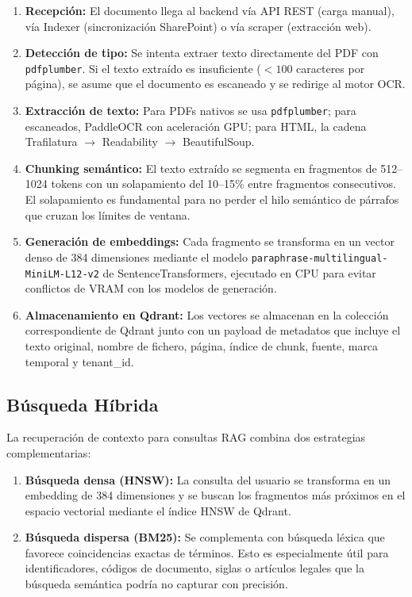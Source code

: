 \begin{enumerate}
    \item \textbf{Recepción:} El documento llega al backend vía API REST (carga manual), vía Indexer (sincronización SharePoint) o vía scraper (extracción web).

    \item \textbf{Detección de tipo:} Se intenta extraer texto directamente del PDF con \texttt{pdfplumber}. Si el texto extraído es insuficiente ($<100$ caracteres por página), se asume que el documento es escaneado y se redirige al motor OCR.

    \item \textbf{Extracción de texto:} Para PDFs nativos se usa \texttt{pdfplumber}; para escaneados, PaddleOCR con aceleración GPU; para HTML, la cadena Trafilatura $\rightarrow$ Readability $\rightarrow$ BeautifulSoup.

    \item \textbf{Chunking semántico:} El texto extraído se segmenta en fragmentos de 512--1024 tokens con un solapamiento del 10--15\% entre fragmentos consecutivos. El solapamiento es fundamental para no perder el hilo semántico de párrafos que cruzan los límites de ventana.

    \item \textbf{Generación de embeddings:} Cada fragmento se transforma en un vector denso de 384 dimensiones mediante el modelo \texttt{paraphrase-multilingual-MiniLM-L12-v2} de SentenceTransformers, ejecutado en CPU para evitar conflictos de VRAM con los modelos de generación.

    \item \textbf{Almacenamiento en Qdrant:} Los vectores se almacenan en la colección correspondiente de Qdrant junto con un payload de metadatos que incluye el texto original, nombre de fichero, página, índice de chunk, fuente, marca temporal y tenant\_id.
\end{enumerate}

\subsection{Búsqueda Híbrida}

La recuperación de contexto para consultas RAG combina dos estrategias complementarias:

\begin{enumerate}
    \item \textbf{Búsqueda densa (HNSW):} La consulta del usuario se transforma en un embedding de 384 dimensiones y se buscan los fragmentos más próximos en el espacio vectorial mediante el índice HNSW de Qdrant.

    \item \textbf{Búsqueda dispersa (BM25):} Se complementa con búsqueda léxica que favorece coincidencias exactas de términos. Esto es especialmente útil para identificadores, códigos de documento, siglas o artículos legales que la búsqueda semántica podría no capturar con precisión.
\end{enumerate}

